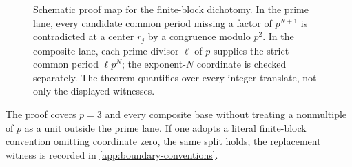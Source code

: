 \begin{figure}[!b]
  \centering
  \resizebox{\textwidth}{!}{}
  \caption{Schematic proof map for the finite-block dichotomy.  In the
  prime lane, every candidate common period missing a factor of
  $p^{N+1}$ is contradicted at a center $r_j$ by a congruence modulo
  $p^2$.  In the composite lane, each prime divisor $\ell$ of $p$ supplies
  the strict common period $\ell p^N$; the exponent-$N$ coordinate is
  checked separately.  The theorem quantifies over every integer
  translate, not only the displayed witnesses.}
  \label{fig:constructive-split}
\end{figure}

The proof covers $p=3$ and every composite base without treating a
nonmultiple of $p$ as a unit outside the prime lane.  If one adopts a
literal finite-block convention omitting coordinate zero, the same split
holds; the replacement witness is recorded in
\cref{app:boundary-conventions}.
